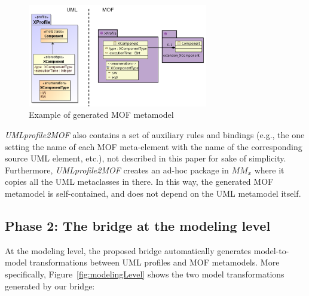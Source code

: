 \begin{figure}[htbp]
	\centering
		\includegraphics[width=0.70\textwidth]{figures/metamodelingExample.png}
	\caption{Example of generated MOF metamodel}
	\label{fig:metamodelingExample}
\end{figure}


\textit{UMLprofile2MOF} also contains a set of auxiliary rules and bindings (e.g., the one setting the name of each MOF meta-element with the name of the corresponding source UML element, etc.), not described in this paper for sake of simplicity. Furthermore, \textit{UMLprofile2MOF} creates an ad-hoc package in $MM_x$ where it copies all the UML metaclasses in there. In this way, the generated MOF metamodel is self-contained, and does not depend on the UML metamodel itself.



\subsection{Phase 2: The bridge at the modeling level}\label{sec:modeLevel}

At the modeling level, the proposed bridge automatically generates model-to-model transformations between UML profiles and MOF metamodels.
More specifically, Figure~\ref{fig:modelingLevel} shows the two model transformations generated by our bridge:

